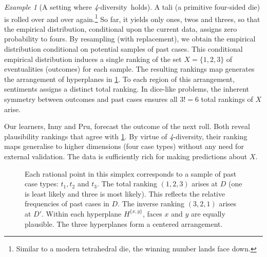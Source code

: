 \documentclass[ecta,nameyear,draft]{econsocart}
\newcommand{\fourdiv}{\textit{4}-\textup{diversity}}
\theoremstyle{plain}
\theoremstyle{remark}
\newtheorem{example}{Example}%
\begin{document}
\begin{example}[A setting where \fourdiv\ holds]\label{eg-tali}
  A tali (a primitive four-sided die) is rolled over and over
  again.\footnote{Similar to a modern tetrahedral die, the winning number lands
  face down.} So far, it yields only ones, twos and threes, so that the
  empirical distribution, conditional upon the current data, assigns zero
  probability to fours. By resampling (with replacement), we obtain the
  empirical distribution conditional on potential samples of past cases. This
  conditional empirical distribution induces a single ranking of the set
  $X=\{1, 2, 3\}$ of eventualities (outcomes) for each sample. The resulting
  rankings map generates the arrangement of hyperplanes in \cref{fig-tali}.  To
  each region of this arrangement, {sentiments} assigns a distinct
  total ranking.  
  In dice-like problems, the inherent symmetry between outcomes and past cases
  ensures all $3!=6$ total rankings of $X$ arise.
 
  Our learners, Inny and {Pru}, forecast the outcome of the next roll.  Both
  reveal plausibility rankings that agree with \cref{fig-tali}. By virtue of
  \fourdiv, their ranking maps generalise to higher dimensions (four case
  types) without any need for external validation. The data is sufficiently
  rich for making predictions about $X$.
  \begin{figure}
    \centering 

    \caption{\label{fig-tali} Each rational point in this simplex corresponds to
      a sample of past case types: $t_1, t_2$ and $t_3$.  The total ranking $(1,
      2, 3)$ arises at $D$ (one is least likely and three is most likely). This
      reflects the relative frequencies of past cases in $D$.  The inverse
      ranking $(3, 2, 1)$ arises at $D'$. Within each hyperplane $H^{\{x, y\}}$,
      faces $x$ and $y$ are equally plausible.  The three hyperplanes form a
      centered arrangement.}
  \end{figure}
\end{example}
\end{document}
